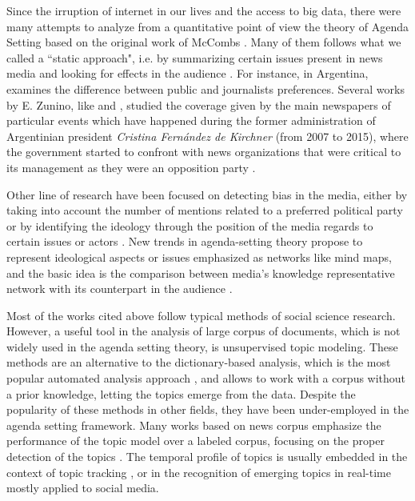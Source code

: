 \documentclass{bmcart}
\begin{document}
\par Since the irruption of internet in our lives and the access to big data, there were many attempts to analyze from a quantitative point of view the theory of Agenda Setting based on  the original work of McCombs \cite{mccombs1972agenda}. Many of them follows what we called a ``static approach", i.e. by summarizing certain issues present in news media and looking for effects in the audience \cite{brians1996campaign, gerber2009does, coleman2007young}.
For instance, in Argentina, \cite{mitchelstein2016brecha} examines the difference between public and journalists preferences. 
Several works by E. Zunino, like \cite{zunino2010cobertura} and \cite{koziner2013cobertura}, studied the coverage given by the main newspapers of particular events which have happened during the former administration of Argentinian president \emph{Cristina Fern\'andez de Kirchner} (from 2007 to 2015), where the government started to confront with news organizations that were critical to its management as they were an opposition party \cite{mitchelstein2017information}.
\par Other line of research have been focused on detecting bias in the media, either by taking into account the number of mentions related  to a preferred political party \cite{lazaridou2016identifying, baumgartner2015all} or by identifying the ideology through the position of the media regards to certain issues or actors \cite{elejalde2018nature, sagarzazu2017hugo}. New trends in agenda-setting theory propose to represent ideological aspects or issues emphasized as networks like mind maps, and the basic idea is the comparison between media's knowledge representative network with its counterpart in the audience \cite{guo2012application, vu2014exploring}.
\par Most of the works cited above follow typical methods of social science research. However, a useful tool in the analysis of large corpus of documents, which is not widely used in the agenda setting theory, is unsupervised topic modeling. These methods are an alternative to the dictionary-based analysis, which is the most popular automated analysis approach \cite{guo2016big}, and allows to work with a corpus without a prior knowledge, letting the topics emerge from the data. Despite the popularity of these methods in other fields, they have been under-employed in the agenda setting framework.
Many works based on news corpus emphasize the performance of the topic model over a labeled corpus, focusing on the proper detection of the topics \cite{dai2010online, po2016topic, brun2000experiment}. The temporal profile of topics is usually embedded in the context of topic tracking \cite{hu2016news, li2017joint}, or in the recognition of emerging topics in real-time \cite{cataldi2010emerging} mostly applied to social media. 
\end{document}
